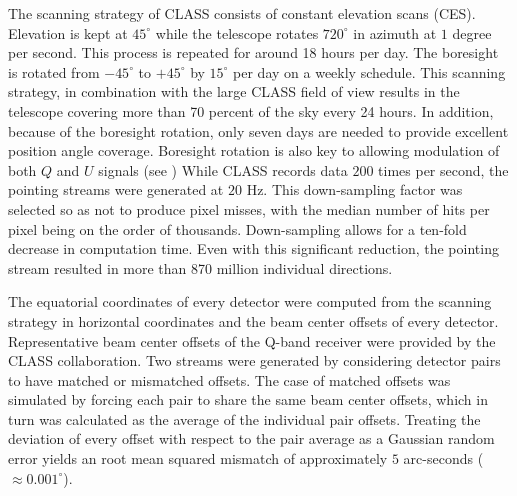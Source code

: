 \documentclass[a4paper,11pt]{article}
\begin{document}
The scanning strategy of CLASS consists of constant elevation scans (CES). Elevation is kept at $45^{\circ}$ while the telescope rotates $720^\circ$ in azimuth at $1$ degree per second. This process is repeated for around 18 hours per day. The boresight is rotated from $-45^{\circ}$ to $+45^{\circ}$ by $15^{\circ}$ per day on a weekly schedule. This scanning strategy, in combination with the large CLASS field of view results in the telescope covering more than 70 percent of the sky every 24 hours. In addition, because of the boresight rotation, only seven days are needed to provide excellent position angle coverage. Boresight rotation is also key to allowing modulation of both $Q$ and $U$ signals (see \cite{2016SPIE.9914E..1KH}) While CLASS records data $200$ times per second, the pointing streams were generated at $20$ Hz. This down-sampling factor was selected so as not to produce pixel misses, with the median number of hits per pixel being on the order of thousands. Down-sampling allows for a ten-fold decrease in computation time. Even with this significant reduction, the pointing stream resulted in more than 870 million individual directions. 


The equatorial coordinates of every detector were computed from the scanning strategy in horizontal coordinates and the beam center offsets of every detector. Representative beam center offsets of the Q-band receiver were provided by the CLASS collaboration. Two streams were generated by considering detector pairs to have matched or mismatched offsets. The case of matched offsets was simulated by forcing each pair to share the same beam center offsets, which in turn was calculated as the average of the individual pair offsets. Treating the deviation of every offset with respect to the pair average as a Gaussian random error yields an root mean squared mismatch of approximately $5$ arc-seconds ($\approx 0.001^{\circ}$).
\end{document}
